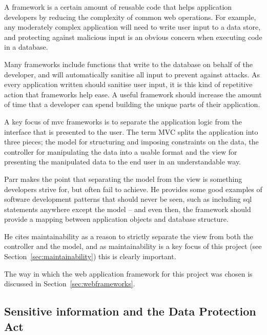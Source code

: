 \documentclass[draft]{scrartcl}
\begin{document}

A framework is a certain amount of reusable code that helps application
developers by reducing the complexity of common web operations. For example,
any moderately complex application will need to write user input to a data
store, and protecting against malicious input is an obvious concern when
executing code in a database.

Many frameworks include functions that write to the database on behalf of the
developer, and will automatically sanitise all input to prevent against
attacks. As every application written should sanitise user input, it is this
kind of repetitive action that frameworks help ease. A useful framework should
increase the amount of time that a developer can spend building the unique
parts of their application.

A key focus of \gls{mvc} frameworks is to separate the application logic from
the interface that is presented to the user. The term MVC splits the
application into three pieces; the model for structuring and imposing
constraints on the data, the controller for manipulating the data into a
usable format and the view for presenting the manipulated data to the end user
in an understandable way.

Parr \cite{Parr2004templateengines} makes the point that separating the model
from the view is something developers strive for, but often fail to achieve.
He provides some good examples of software development patterns that should
never be seen, such as including \gls{sql} statements anywhere except the
model -- and even then, the framework should provide a mapping between
application objects and database structure.

He cites maintainability as a reason to strictly separate the view from both
the controller and the model, and as maintainability is a key focus of this
project (see Section~\ref{sec:maintainability}) this is clearly important.


The way in which the web application framework for this project was chosen is
discussed in Section~\ref{sec:webframeworks}.

\subsection{Sensitive information and the Data Protection Act}
\label{sec:dataprotection}

\end{document}
